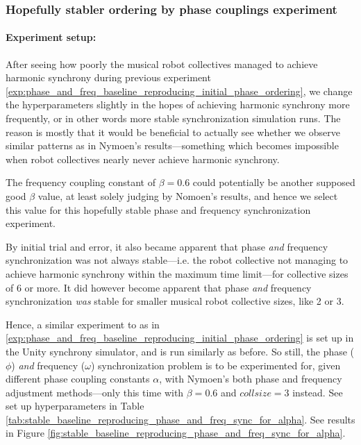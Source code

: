 		
		
		\subsubsection{Hopefully stabler ordering by phase couplings experiment}
		
			\paragraph{Experiment setup:\nl}
			
			After seeing how poorly the musical robot collectives managed to achieve harmonic synchrony during previous experiment \ref{exp:phase_and_freq_baseline_reproducing_initial_phase_ordering}, we change the hyperparameters slightly in the hopes of achieving harmonic synchrony more frequently, or in other words more stable synchronization simulation runs. The reason is mostly that it would be beneficial to actually see whether we observe similar patterns as in Nymoen's results—something which becomes impossible when robot collectives nearly never achieve harmonic synchrony.
			
			The frequency coupling constant of $\beta=0.6$ could potentially be another supposed good $\beta$ value, at least solely judging by Nomoen's results, and hence we select this value for this hopefully stable phase and frequency synchronization experiment.
			
			By initial trial and error, it also became apparent that phase \textit{and} frequency synchronization was not always stable—i.e. the robot collective not managing to achieve harmonic synchrony within the maximum time limit—for collective sizes of 6 or more. It did however become apparent that phase \textit{and} frequency synchronization \textit{was} stable for smaller musical robot collective sizes, like 2 or 3.
			
			Hence, a similar experiment to as in \ref{exp:phase_and_freq_baseline_reproducing_initial_phase_ordering} is set up in the Unity synchrony simulator, and is run similarly as before. So still, the phase ($\phi$) \textit{and} frequency ($\omega$) synchronization problem is to be experimented for, given different phase coupling constants $\alpha$, with Nymoen's both phase and frequency adjustment methods—only this time with $\beta=0.6$ and $collsize=3$ instead. See set up hyperparameters in Table \ref{tab:stable_baseline_reproducing_phase_and_freq_sync_for_alpha}. See results in Figure \ref{fig:stable_baseline_reproducing_phase_and_freq_sync_for_alpha}.
			
